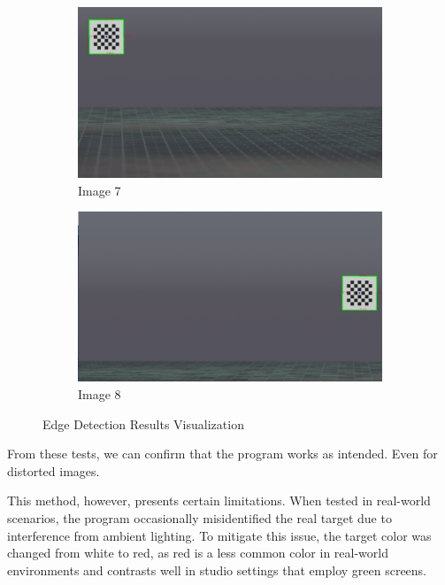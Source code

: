 \begin{figure}[h!]
    \begin{subfigure}[b]{0.45\textwidth}
        \centering
        \includegraphics[width=\textwidth]{Images/02stateart/edge_detection_7.png}
        \caption{Image 7}
    \end{subfigure}
    \hfill
    \begin{subfigure}[b]{0.45\textwidth}
        \centering
        \includegraphics[width=\textwidth]{Images/02stateart/edge_detection_8.png}
        \caption{Image 8}
    \end{subfigure}
    
    \caption{Edge Detection Results Visualization}
    \label{fig:Edge Detection Results Visualization}
\end{figure}

\noindent From these tests, we can confirm that the program works as intended. Even for distorted images.

\noindent This method, however, presents certain limitations. When tested in real-world scenarios, the program occasionally misidentified the real target due to interference from ambient lighting. To mitigate this issue, the target color was changed from white to red, as red is a less common color in real-world environments and contrasts well in studio settings that employ green screens.